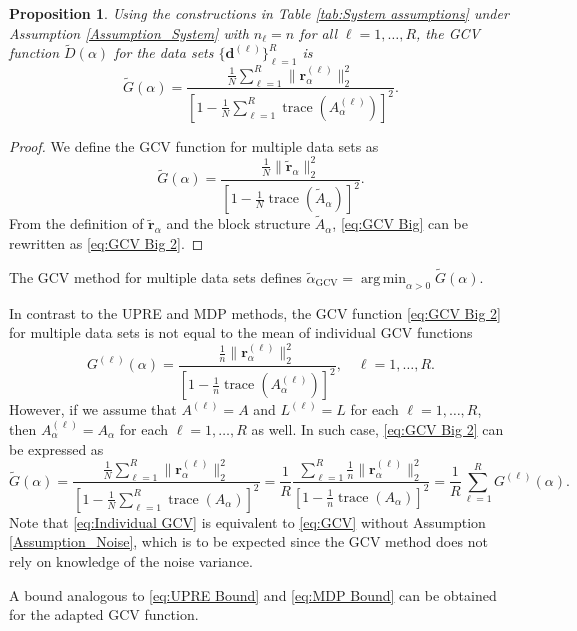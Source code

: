 \documentclass[12pt]{article}
\newcommand{\dVec}{\mathbf{d}}	%
\DeclareMathOperator{\trace}{trace}		%
\newcommand{\regparam}{\alpha}  %
\DeclareMathOperator*{\argmin}{arg\,min}
\newcommand{\regres}{\mathbf{r}_{\regparam}}	%
\newcommand{\A}{A_{\regparam}}	%
\newcommand{\G}{G}	%
\newcommand{\D}{D}	%
\newtheorem{proposition}{Proposition}[section]
\begin{document}
\begin{proposition}
Using the constructions in Table \ref{tab:System assumptions} under Assumption \ref{Assumption_System} with $n_\ell = n$ for all $\ell = 1,\ldots,R$, the GCV function $\widetilde{\D}(\regparam)$ for the data sets $\{\dVec^{(\ell)}\}_{\ell=1}^R$ is
\begin{equation}
\label{eq:GCV Big 2}
\widetilde{\G}(\regparam) = \frac{\frac{1}{N}\sum_{\ell=1}^R \|\regres^{(\ell)}\|_2^2}{\left[1 - \frac{1}{N}\sum_{\ell=1}^R \trace\left(\A^{(\ell)}\right)\right]^2}.
\end{equation}
\end{proposition}
\begin{proof}
We define the GCV function for multiple data sets as
\begin{equation}
\label{eq:GCV Big}
\widetilde{\G}(\regparam) = \frac{\frac{1}{N}\|\widetilde{\mathbf{r}}_\regparam\|_2^2}{\left[1 - \frac{1}{N}\trace(\widetilde{A}_\regparam)\right]^2}.
\end{equation}
From the definition of $\widetilde{\mathbf{r}}_\regparam$ and the block structure $\widetilde{A}_\regparam$, \eqref{eq:GCV Big} can be rewritten as \eqref{eq:GCV Big 2}.
\end{proof} 
\noindent The GCV method for multiple data sets defines $\widetilde{\regparam}_{\textrm{GCV}} = \argmin_{\regparam > 0} \widetilde{\G}(\regparam)$. \par 
In contrast to the UPRE and MDP methods, the GCV function \eqref{eq:GCV Big 2} for multiple data sets is not equal to the mean of individual GCV functions
\begin{equation}
\label{eq:Individual GCV}
\G^{(\ell)}(\regparam) = \frac{\frac{1}{n}\|\regres^{(\ell)}\|_2^2}{\left[1 - \frac{1}{n}\trace\left(\A^{(\ell)}\right)\right]^2}, \quad \ell = 1,\ldots,R.
\end{equation}
However, if we assume that $A^{(\ell)} = A$ and $L^{(\ell)} = L$ for each $\ell = 1,\ldots,R$, then $\A^{(\ell)} = \A$ for each $\ell = 1,\ldots,R$ as well. In such case, \eqref{eq:GCV Big 2} can be expressed as
\begin{equation}
\label{eq:Averaged GCV}
\widetilde{\G}(\regparam) = \frac{\frac{1}{N}\sum_{\ell=1}^R \|\regres^{(\ell)}\|_2^2}{\left[1 - \frac{1}{N}\sum_{\ell=1}^R \trace\left(\A\right)\right]^2} = \frac{1}{R}\frac{\sum_{\ell=1}^R \frac{1}{n} \|\regres^{(\ell)}\|_2^2}{\left[1 - \frac{1}{n} \trace\left(\A\right)\right]^2} = \frac{1}{R}\sum_{\ell=1}^R \G^{(\ell)}(\regparam).
\end{equation}
Note that \eqref{eq:Individual GCV} is equivalent to \eqref{eq:GCV} without Assumption \ref{Assumption_Noise}, which is to be expected since the GCV method does not rely on knowledge of the noise variance. \par 
A bound analogous to \eqref{eq:UPRE Bound} and \eqref{eq:MDP Bound} can be obtained for the adapted GCV function.
\end{document}
